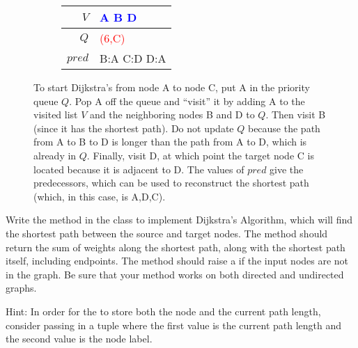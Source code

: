 \begin{figure}[H]
\begin{subfigure}{.6\textwidth}
    \centering
\end{subfigure}
%
\begin{subfigure}{.39\textwidth}
    \Large\begin{tabular}{r|l}
    $V$ & \textcolor{blue}{A B D} \\ \hline
        $Q$ & \textcolor{red}{(6,C)} \\ \hline
    $pred$ & B:A C:D D:A \\
    \end{tabular}
\end{subfigure}
\caption{To start Dijkstra's from node A to node C, put A in the priority queue $Q$.
Pop A off the queue and ``visit'' it by adding A to the visited list $V$ and the neighboring nodes B and D to $Q$.
Then visit B (since it has the shortest path).
Do not update $Q$ because the path from A to B to D is longer than the path from A to D, which is already in $Q$.
Finally, visit D, at which point the target node C is located because it is adjacent to D.
The values of $pred$ give the predecessors, which can be used to reconstruct the shortest path (which, in this case, is A,D,C).
}
\end{figure}

\begin{problem}
\label{prob:dijkstra}
Write the  method in the  class to implement Dijkstra's Algorithm, which will find the shortest path between the source and target nodes.
The method should return the sum of weights along the shortest path, along with the shortest path itself, including endpoints.
The method should raise a  if the input nodes are not in the graph.
Be sure that your method works on both directed and undirected graphs.

Hint: In order for the  to store both the node and the current path length, consider passing in a tuple where the first value is the current path length and the second value is the node label.
\end{problem}

